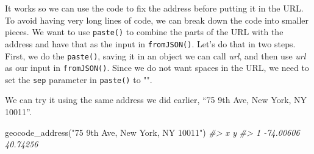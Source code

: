 \documentclass[
  12pt,
  openany]{book}
\newenvironment{Shaded}{\begin{snugshade}}{\end{snugshade}}
\newcommand{\AttributeTok}[1]{\textcolor[rgb]{0.61,0.61,0.61}{#1}}
\newcommand{\CommentTok}[1]{\textcolor[rgb]{0.37,0.37,0.37}{\textit{#1}}}
\newcommand{\ControlFlowTok}[1]{\textcolor[rgb]{0.27,0.27,0.27}{\textbf{#1}}}
\newcommand{\DecValTok}[1]{\textcolor[rgb]{0.06,0.06,0.06}{#1}}
\newcommand{\FunctionTok}[1]{\textcolor[rgb]{0,0,0}{#1}}
\newcommand{\NormalTok}[1]{#1}
\newcommand{\OtherTok}[1]{\textcolor[rgb]{0.37,0.37,0.37}{#1}}
\newcommand{\SpecialCharTok}[1]{\textcolor[rgb]{0,0,0}{#1}}
\newcommand{\StringTok}[1]{\textcolor[rgb]{0.5,0.5,0.5}{#1}}
\begin{document}
It works so we can use the code to fix the address before putting it in the URL. To avoid having very long lines of code, we can break down the code into smaller pieces. We want to use \texttt{paste()} to combine the parts of the URL with the address and have that as the input in \texttt{fromJSON()}. Let's do that in two steps. First, we do the \texttt{paste()}, saving it in an object we can call \emph{url}, and then use \emph{url} as our input in \texttt{fromJSON()}. Since we do not want spaces in the URL, we need to set the \texttt{sep} parameter in \texttt{paste()} to "".

\begin{Shaded}
\end{Shaded}

We can try it using the same address we did earlier, ``75 9th Ave, New York, NY 10011''.

\begin{Shaded}
\begin{Highlighting}[]
\FunctionTok{geocode\_address}\NormalTok{(}\StringTok{"75 9th Ave, New York, NY 10011"}\NormalTok{)}
\CommentTok{\#\textgreater{}           x        y}
\CommentTok{\#\textgreater{} 1 {-}74.00606 40.74256}
\end{Highlighting}
\end{Shaded}
\end{document}
